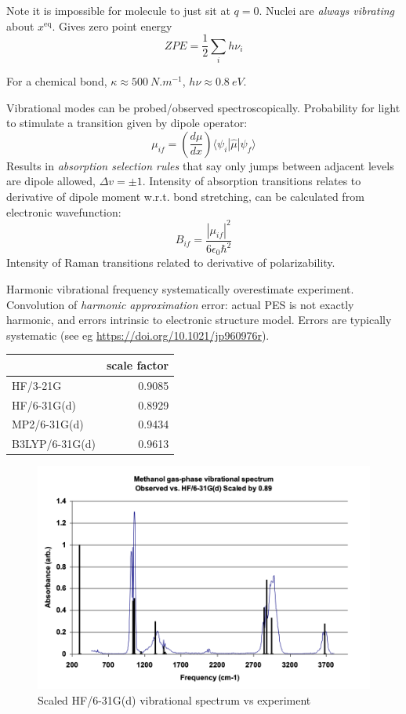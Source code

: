 \documentclass[11pt]{article}
\begin{document}
Note it is impossible for molecule to just sit at \(q = 0\).  Nuclei are \emph{always vibrating} about \(x^\text{eq}\). Gives zero point energy
\[ZPE = \frac{1}{2}\sum_i h\nu_i\]

For a chemical bond, \(\kappa\approx \SI{500}{N.m^{-1}}\), \(h\nu \approx \SI{0.8}{eV}\).

Vibrational modes can be probed/observed spectroscopically.  Probability for light to stimulate a transition given by dipole operator:
\[\mu_{if} = \left(
        \frac{d\mu}{dx}\right ) \langle \psi_i|\hat\mu |\psi_f \rangle\]
Results in \emph{absorption selection rules} that say only jumps between adjacent levels are dipole allowed, \(\Delta v = \pm 1\).  
Intensity of absorption transitions relates to derivative of dipole moment w.r.t. bond stretching, can be calculated from electronic wavefunction:
\[B_{if}=\frac{|\mu_{if}|^2}{6\epsilon_0\hbar^2}\]
Intensity of Raman transitions related to derivative of polarizability.

Harmonic vibrational frequency systematically overestimate experiment. Convolution of \emph{harmonic approximation} error: actual PES is not exactly harmonic, and errors intrinsic to electronic structure model.  Errors are typically systematic (see eg \url{https://doi.org/10.1021/jp960976r}).

\begin{center}
\begin{tabular}{lr}
 & scale factor\\
\hline
HF/3-21G & 0.9085\\
HF/6-31G(d) & 0.8929\\
MP2/6-31G(d) & 0.9434\\
B3LYP/6-31G(d) & 0.9613\\
\end{tabular}
\end{center}

\begin{figure}[htbp]
\centering
\includegraphics[width=.9\linewidth]{./Images/Methanol.png}
\caption{Scaled HF/6-31G(d) vibrational spectrum vs experiment}
\end{figure}
\end{document}
